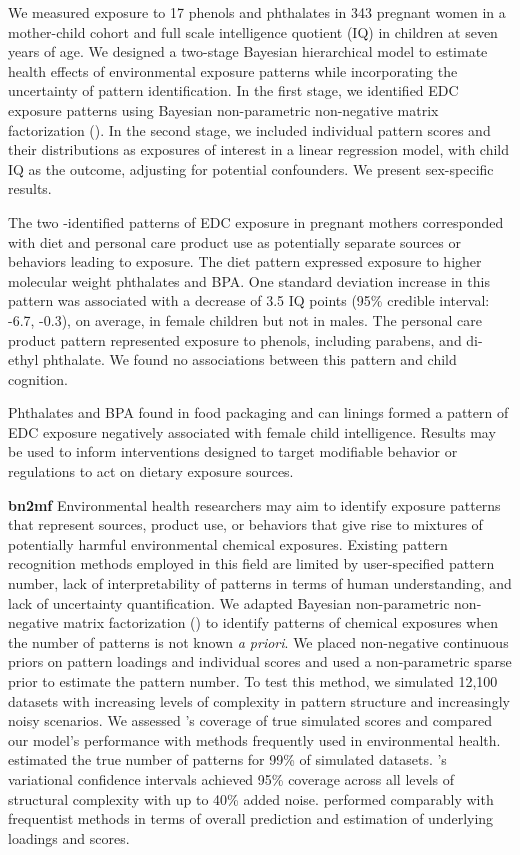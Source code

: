 {We measured exposure to 17 phenols and phthalates in 343 pregnant women in a mother-child cohort and full scale intelligence quotient (IQ) in children at seven years of age. We designed a two-stage Bayesian hierarchical model to estimate health effects of environmental exposure patterns while incorporating the uncertainty of pattern identification. In the first stage, we identified EDC exposure patterns using Bayesian non-parametric non-negative matrix factorization (\bnmfc). In the second stage, we included individual pattern scores and their distributions as exposures of interest in a linear regression model, with child IQ as the outcome, adjusting for potential confounders. We present sex-specific results.

The two \bnmfc-identified patterns of EDC exposure in pregnant mothers corresponded with diet and personal care product use as potentially separate sources or behaviors leading to exposure. The diet pattern expressed exposure to higher molecular weight phthalates and BPA. One standard deviation increase in this pattern was associated with a decrease of 3.5 IQ points (95\% credible interval: -6.7, -0.3), on average, in female children but not in males. The personal care product pattern represented exposure to phenols, including parabens, and di-ethyl phthalate. We found no associations between this pattern and child cognition.

Phthalates and BPA found in food packaging and can linings formed a pattern of EDC exposure negatively associated with female child intelligence. Results may be used to inform interventions designed to target modifiable behavior or regulations to act on dietary exposure sources.

\textbf{bn2mf}
Environmental health researchers may aim to identify exposure patterns that represent sources, product use, or behaviors that give rise to mixtures of potentially harmful environmental chemical exposures. Existing pattern recognition methods employed in this field are limited by user-specified pattern number, lack of interpretability of patterns in terms of human understanding, and lack of uncertainty quantification. We adapted Bayesian non-parametric non-negative matrix factorization (\bnmfc) to identify patterns of chemical exposures when the number of patterns is not known \textit{a priori}. We placed non-negative continuous priors on pattern loadings and individual scores and used a non-parametric sparse prior to estimate the pattern number. To test this method, we simulated 12,100 datasets with increasing levels of complexity in pattern structure and increasingly noisy scenarios. We assessed \bnmfc's coverage of true simulated scores and compared our model's performance with methods frequently used in environmental health. \bnmf estimated the true number of patterns for 99\% of simulated datasets. \bnmfc's variational confidence intervals achieved 95\% coverage across all levels of structural complexity with up to 40\% added noise. \bnmf performed comparably with frequentist methods in terms of overall prediction and estimation of underlying loadings and scores.

}
